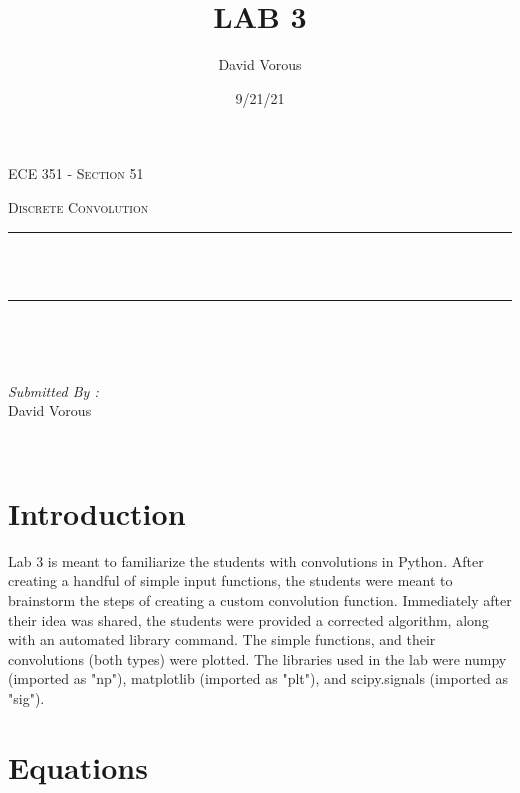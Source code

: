 \documentclass[12pt]{report}
\title{LAB 3}
\author{ David Vorous}
\date{9/21/21}
\makeatletter
\let\thetitle\@title
\makeatother
\begin{document}
\begin{titlepage}
	\centering
    \vspace*{0.5 cm}
\begin{center}    \textsc{\Large   ECE 351 - Section 51 }\\[2.0 cm]	\end{center}
	\textsc{\Large Discrete Convolution  }\\[0.5 cm]
	\rule{\linewidth}{0.2 mm} \\[0.4 cm]
	{ \huge \bfseries \thetitle}\\
	\rule{\linewidth}{0.2 mm} \\[1.5 cm]
	
	\begin{minipage}{0.4\textwidth}
		\begin{flushleft} \large
			\end{flushleft}
			\end{minipage}~
			\begin{minipage}{0.4\textwidth}
            
			\begin{flushright} \large
			\emph{Submitted By :} \\
			David Vorous  
		\end{flushright}
           
	\end{minipage}\\[2 cm]

\end{titlepage}


\tableofcontents

\pagebreak

\renewcommand{\thesection}{\arabic{section}}

\section{Introduction}

Lab 3 is meant to familiarize the students with convolutions in Python. After creating a handful of simple input functions, the students were meant to brainstorm the steps of creating a custom convolution function. Immediately after their idea was shared, the students were provided a corrected algorithm, along with an automated library command. The simple functions, and their convolutions (both types) were plotted. The libraries used in the lab were numpy (imported as "np"), matplotlib (imported as "plt"), and scipy.signals (imported as "sig").

\section{Equations}
\end{document}
